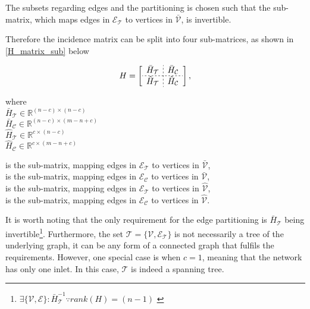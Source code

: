The subsets regarding edges and the partitioning is chosen such that the sub-matrix, which maps edges in $\mathcal{E_{\mathcal{T}}}$ to vertices in $\bar{\mathcal{V}}$, is invertible. 

Therefore the incidence matrix can be split into four sub-matrices, as shown in \eqref{H_matrix_sub} below

\begin{equation}
\label{H_matrix_sub}
H=
\left[
\begin{array}{c;{2pt/2pt}r}
\bar{H}_{\mathcal{T}} & \bar{H}_{\mathcal{C}} \\
\hdashline[2pt/2pt]
\hat{H}_{\mathcal{T}} & \hat{H}_{\mathcal{C}}
\end{array}
\right],
\end{equation}

\begin{minipage}[t]{0.3\textwidth}
where\\
\hspace*{8mm} $\bar{H}_{\mathcal{T}} \in \mathbb{R}^{(n-c) \times (n-c)}$\\ 
\hspace*{8mm} $\bar{H}_{\mathcal{C}} \in \mathbb{R}^{(n-c) \times (m-n+c)}$\\
\hspace*{8mm} $\hat{H}_{\mathcal{T}} \in \mathbb{R}^{c \times (n-c)}$\\
\hspace*{8mm} $\hat{H}_{\mathcal{C}} \in \mathbb{R}^{c \times (m-n+c)}$
\end{minipage}
\begin{minipage}[t]{0.68\textwidth}
\vspace*{-0.1mm}
is the sub-matrix, mapping edges in $\mathcal{E_{\mathcal{T}}}$ to vertices in $\bar{\mathcal{V}}$,\\ 
is the sub-matrix, mapping edges in $\mathcal{E_{\mathcal{C}}}$ to vertices in $\bar{\mathcal{V}}$,\\
is the sub-matrix, mapping edges in $\mathcal{E_{\mathcal{T}}}$ to vertices in $\hat{\mathcal{V}}$,\\
is the sub-matrix, mapping edges in $\mathcal{E_{\mathcal{C}}}$ to vertices in $\hat{\mathcal{V}}$. 
\end{minipage}

It is worth noting that the only requirement for the edge partitioning is $\bar{H}_{\mathcal{T}}$ being invertible\footnote{$\exists \{\mathcal{V}, \mathcal{E} \} : \bar{H}^{-1}_{\mathcal{T}} \because rank(H) = (n-1) $ \cite{deo2017graph} }. Furthermore, the set $\mathcal{T} = \{\mathcal{V}, \mathcal{E_{\mathcal{T}}} \}$ is not necessarily a tree of the underlying graph, it can be any form of a connected graph that fulfils the requirements. However, one special case is when $c = 1$, meaning that the network has only one inlet. In this case, $\mathcal{T}$ is indeed a spanning tree. 


